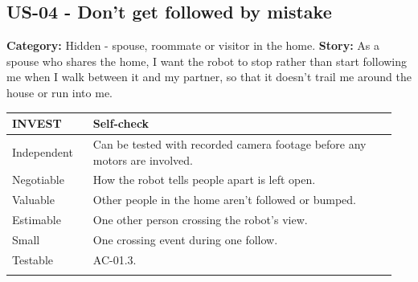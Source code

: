 \documentclass[12pt,letterpaper]{article}
\begin{document}
\par\medskip
\begin{minipage}{\linewidth}
\subsection*{US-04 - Don't get followed by mistake}

\textbf{Category:} Hidden - spouse, roommate or visitor in the home. \textbf{Story:} As a spouse who shares the home, I want the robot to stop rather than start following me when I walk between it and my partner, so that it doesn't trail me around the house or run into me.

\begingroup\small

\begin{tabular}{@{}>{\RaggedRight\arraybackslash}p{0.2\linewidth}>{\RaggedRight\arraybackslash}p{0.75\linewidth}@{}}

\toprule\textbf{INVEST} & \textbf{Self-check}\\\midrule

Independent & Can be tested with recorded camera footage before any motors are involved. \\ \addlinespace[3pt]

Negotiable & How the robot tells people apart is left open. \\ \addlinespace[3pt]

Valuable & Other people in the home aren't followed or bumped. \\ \addlinespace[3pt]

Estimable & One other person crossing the robot's view. \\ \addlinespace[3pt]

Small & One crossing event during one follow. \\ \addlinespace[3pt]

Testable & AC-01.3. \\ \addlinespace[3pt]

\bottomrule
\end{tabular}

\endgroup
\end{minipage}
\par\medskip
\end{document}
